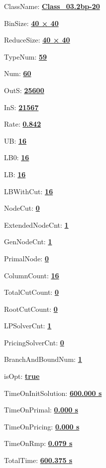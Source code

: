 \documentclass[11pt]{article}
\begin{document}
\pagestyle{empty}


ClassName: \underline{\textbf{Class_03.2bp-20}}
\par
BinSize: \underline{\textbf{40 × 40}}
\par
ReduceSize: \underline{\textbf{40 × 40}}
\par
TypeNum: \underline{\textbf{59}}
\par
Num: \underline{\textbf{60}}
\par
OutS: \underline{\textbf{25600}}
\par
InS: \underline{\textbf{21567}}
\par
Rate: \underline{\textbf{0.842}}
\par
UB: \underline{\textbf{16}}
\par
LB0: \underline{\textbf{16}}
\par
LB: \underline{\textbf{16}}
\par
LBWithCut: \underline{\textbf{16}}
\par
NodeCut: \underline{\textbf{0}}
\par
ExtendedNodeCnt: \underline{\textbf{1}}
\par
GenNodeCnt: \underline{\textbf{1}}
\par
PrimalNode: \underline{\textbf{0}}
\par
ColumnCount: \underline{\textbf{16}}
\par
TotalCutCount: \underline{\textbf{0}}
\par
RootCutCount: \underline{\textbf{0}}
\par
LPSolverCnt: \underline{\textbf{1}}
\par
PricingSolverCnt: \underline{\textbf{0}}
\par
BranchAndBoundNum: \underline{\textbf{1}}
\par
isOpt: \underline{\textbf{true}}
\par
TimeOnInitSolution: \underline{\textbf{600.000 s}}
\par
TimeOnPrimal: \underline{\textbf{0.000 s}}
\par
TimeOnPricing: \underline{\textbf{0.000 s}}
\par
TimeOnRmp: \underline{\textbf{0.079 s}}
\par
TotalTime: \underline{\textbf{600.375 s}}
\par
\newpage


\end{document}
